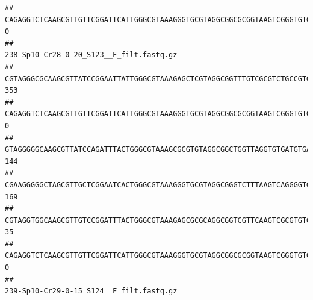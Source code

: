 \documentclass[]{article}
\begin{document}
\begin{verbatim}
## CAGAGGTCTCAAGCGTTGTTCGGATTCATTGGGCGTAAAGGGTGCGTAGGCGGCGCGGTAAGTCGGGTGTGAAATCTCGGGGCTTAACTCCGAAACTGCATTCGATACTGCCGTGCTTGAGGACTGGAGAGGAGACTGGAATTTACGGTGTAGCGGTGAAATGCGTAGATATCGTAAGGAAGACCAGTGGCGAAGGCGGGTCTCTGGACAGTTCCTGACGCTGAGGCACGAAGGCCAGGGGAGCAAACG                                       0
##                                                                                                                                                                                                                                                           238-Sp10-Cr28-0-20_S123__F_filt.fastq.gz
## CGTAGGGCGCAAGCGTTATCCGGAATTATTGGGCGTAAAGAGCTCGTAGGCGGTTTGTCGCGTCTGCCGTGAAAGTCCGGGGCTCAACTCCGGATCTGCGGTGGGTACGGGCAGACTAGAGTGATGTAGGGGAGACTGGAATTCCTGGTGTAGCGGTGAAATGCGCAGATATCAGGAGGAACACCGATGGCGAAGGCAGGTCTCTGGGCATTAACTGACGCTGAGGAGCGAAAGCATGGGGAGCGAACA                                      353
## CAGAGGTCTCAAGCGTTGTTCGGATTCATTGGGCGTAAAGGGTGCGTAGGCGGCGCGGTAAGTCGGGTGTGAAATCTCGGAGCTTAACTCCGAAACTGCATTCGATACTGCCGTGCTTGAGGACTGGAGAGGAGACTGGAATTTACGGTGTAGCGGTGAAATGCGTAGATATCGTAAGGAAGACCAGTGGCGAAGGCGGGTCTCTGGACAGTTCCTGACGCTGAGGCACGAAGGCCAGGGGAGCAAACG                                        0
## GTAGGGGGCAAGCGTTATCCAGATTTACTGGGCGTAAAGCGCGTGTAGGCGGCTGGTTAGGTGTGATGTGAAATCTTCCGGCTCAACCGGAAAACTGCATTGCAAACCGGCCTGGCTAGAGTGCAGGAGAGGGAAGCGGAATTCCAGGTGTAGCGGTGAAATGCGTAGATATCTGGAGGAACACCAGTGGCGAAGGCGGCTTCCTGGCCTGCAACTGACGCTGAGACGCGAAAGCGTGGGGAGCGAAC                                       144
## CGAAGGGGGCTAGCGTTGCTCGGAATCACTGGGCGTAAAGGGTGCGTAGGCGGGTCTTTAAGTCAGGGGTGAAATCCTGGAGCTCAACTCCAGAACTGCCTTTGATACTGAAGATCTTGAGTTCGGGAGAGGTGAGTGGAACTGCGAGTGTAGAGGTGAAATTCGTAGATATTCGCAAGAACACCAGTGGCGAAGGCGGCTCACTGGCCCGATACTGACGCTGAGGCACGAAAGCGTGGGGAGCAAACA                                      169
## CGTAGGTGGCAAGCGTTGTCCGGATTTACTGGGCGTAAAGAGCGCGCAGGCGGTCGTTCAAGTCGCGTGTGAAAGCCCCCGGCTCAACTGGGGAGGGTCACGCGATACTGATCGACTCGAAGGCAGGAGAGGGTAGTGGAATTCCCGGTGTAGTGGTGAAATGCGTAGATATCGGGAGGAACACCAGTGGCGAAGGCGACTACCTGGCCTGTTCTTGACGCTGAGGCGCGAAAGCTAGGGGAGCAAACG                                       35
## CAGAGGTCTCAAGCGTTGTTCGGATTCATTGGGCGTAAAGGGTGCGTAGGCGGCGCGGTAAGTCGGGTGTGAAATCTCGGGGCTTAACTCCGAAACTGCATTCGATACTGCCGTGCTTGAGGACTGGAGAGGAGACTGGAATTTACGGTGTAGCGGTGAAATGCGTAGATATCGTAAGGAAGACCAGTGGCGAAGGCGGGTCTCTGGACAGTTCCTGACGCTGAGGCACGAAGGCCAGGGGAGCAAACG                                        0
##                                                                                                                                                                                                                                                           239-Sp10-Cr29-0-15_S124__F_filt.fastq.gz

\end{verbatim}
\end{document}
